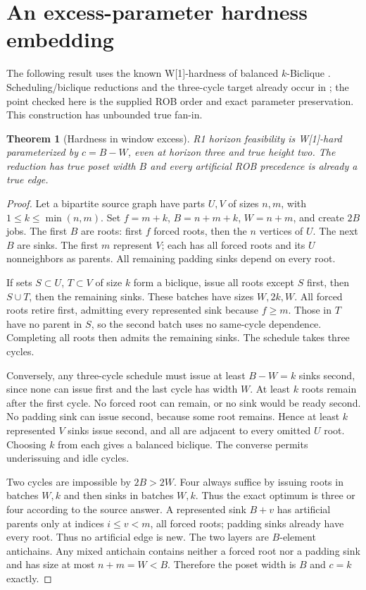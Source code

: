 \documentclass[11pt]{article}
\newtheorem{theorem}{Theorem}
\begin{document}
\section{An excess-parameter hardness embedding}
The following result uses the known W[1]-hardness of balanced $k$-Biclique
\cite{lin}. Scheduling/biclique reductions and the three-cycle target
already occur in \cite{jansen}; the point checked here is the supplied
ROB order and exact parameter preservation. This construction has
unbounded true fan-in.

\begin{theorem}[Hardness in window excess]
R1 horizon feasibility is W[1]-hard parameterized by $c=B-W$, even at
horizon three and true height two. The reduction has true poset width $B$
and every artificial ROB precedence is already a true edge.
\end{theorem}
\begin{proof}
Let a bipartite source graph have parts $U,V$ of sizes $n,m$, with
$1\le k\le\min(n,m)$. Set $f=m+k$, $B=n+m+k$, $W=n+m$, and create
$2B$ jobs. The first $B$ are roots: first $f$ forced roots, then the
$n$ vertices of $U$. The next $B$ are sinks. The first $m$ represent $V$;
each has all forced roots and its $U$ nonneighbors as parents. All remaining
padding sinks depend on every root.

If sets $S\subset U$, $T\subset V$ of size $k$ form a biclique, issue
all roots except $S$ first, then $S\cup T$, then the remaining sinks.
These batches have sizes $W,2k,W$. All forced roots retire first, admitting
every represented sink because $f\ge m$. Those in $T$ have no parent in
$S$, so the second batch uses no same-cycle dependence. Completing all roots
then admits the remaining sinks. The schedule takes three cycles.

Conversely, any three-cycle schedule must issue at least $B-W=k$ sinks
second, since none can issue first and the last cycle has width $W$.
At least $k$ roots remain after the first cycle. No forced root can remain,
or no sink would be ready second. No padding sink can issue second, because
some root remains. Hence at least $k$ represented $V$ sinks issue second,
and all are adjacent to every omitted $U$ root. Choosing $k$ from each gives
a balanced biclique. The converse permits underissuing and idle cycles.

Two cycles are impossible by $2B>2W$. Four always suffice by issuing roots
in batches $W,k$ and then sinks in batches $W,k$. Thus the exact optimum is
three or four according to the source answer. A represented sink $B+v$
has artificial parents only at indices $i\le v<m$, all forced roots;
padding sinks already have every root. Thus no artificial edge is new.
The two layers are $B$-element antichains. Any mixed antichain contains
neither a forced root nor a padding sink and has size at most $n+m=W<B$.
Therefore the poset width is $B$ and $c=k$ exactly.
\end{proof}
\end{document}
